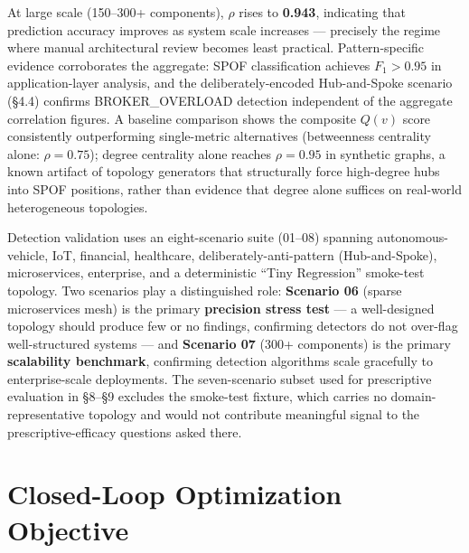 \documentclass[11pt]{article}
\begin{document}
At large scale (150--300+ components), $\rho$ rises to \textbf{0.943}, indicating that prediction
accuracy improves as system scale increases --- precisely the regime where manual architectural
review becomes least practical. Pattern-specific evidence corroborates the aggregate: SPOF
classification achieves $F_1 > 0.95$ in application-layer analysis, and the deliberately-encoded
Hub-and-Spoke scenario (\S4.4) confirms BROKER\_OVERLOAD detection independent of the aggregate
correlation figures. A baseline comparison shows the composite $Q(v)$ score consistently outperforming
single-metric alternatives (betweenness centrality alone: $\rho = 0.75$); degree centrality alone
reaches $\rho = 0.95$ in synthetic graphs, a known artifact of topology generators that structurally
force high-degree hubs into SPOF positions, rather than evidence that degree alone suffices on
real-world heterogeneous topologies.

Detection validation uses an eight-scenario suite (01--08) spanning autonomous-vehicle, IoT,
financial, healthcare, deliberately-anti-pattern (Hub-and-Spoke), microservices, enterprise, and a
deterministic ``Tiny Regression'' smoke-test topology. Two scenarios play a distinguished role:
\textbf{Scenario 06} (sparse microservices mesh) is the primary \textbf{precision stress test} --- a
well-designed topology should produce few or no findings, confirming detectors do not over-flag
well-structured systems --- and \textbf{Scenario 07} (300+ components) is the primary
\textbf{scalability benchmark}, confirming detection algorithms scale gracefully to enterprise-scale
deployments. The seven-scenario subset used for prescriptive evaluation in \S8--\S9 excludes the
smoke-test fixture, which carries no domain-representative topology and would not contribute
meaningful signal to the prescriptive-efficacy questions asked there.

\section{Closed-Loop Optimization Objective}
\end{document}
